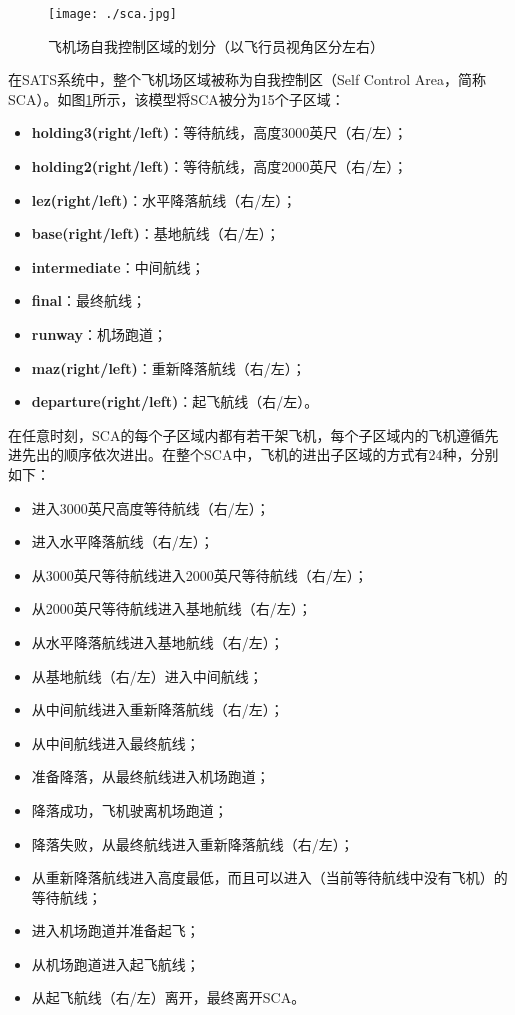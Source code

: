 \begin{figure}
	\centering
	\texttt{[image: ./sca.jpg]}
	\caption{飞机场自我控制区域的划分（以飞行员视角区分左右）}
	\label{fig:example:sats:sca}
\end{figure}

在SATS系统中，整个飞机场区域被称为自我控制区（Self Control Area，简称SCA）。如图\ref{fig:example:sats:sca}所示，该模型将SCA被分为15个子区域：
\begin{itemize}
	\item \textbf{holding3(right/left)}：等待航线，高度3000英尺（右/左）；
	\item \textbf{holding2(right/left)}：等待航线，高度2000英尺（右/左）；
	\item \textbf{lez(right/left)}：水平降落航线（右/左）；
	\item \textbf{base(right/left)}：基地航线（右/左）；
	\item \textbf{intermediate}：中间航线；
	\item \textbf{final}：最终航线；
	\item \textbf{runway}：机场跑道；
	\item \textbf{maz(right/left)}：重新降落航线（右/左）；
	\item \textbf{departure(right/left)}：起飞航线（右/左）。
\end{itemize}
在任意时刻，SCA的每个子区域内都有若干架飞机，每个子区域内的飞机遵循先进先出的顺序依次进出。在整个SCA中，飞机的进出子区域的方式有24种，分别如下：
\begin{itemize}
	\item 进入3000英尺高度等待航线（右/左）；
	\item 进入水平降落航线（右/左）；
	\item 从3000英尺等待航线进入2000英尺等待航线（右/左）；
	\item 从2000英尺等待航线进入基地航线（右/左）；
	\item 从水平降落航线进入基地航线（右/左）；
	\item 从基地航线（右/左）进入中间航线；
	\item 从中间航线进入重新降落航线（右/左）；
	\item 从中间航线进入最终航线；
	\item 准备降落，从最终航线进入机场跑道；
	\item 降落成功，飞机驶离机场跑道；
	\item 降落失败，从最终航线进入重新降落航线（右/左）；
	\item 从重新降落航线进入高度最低，而且可以进入（当前等待航线中没有飞机）的等待航线；
	\item 进入机场跑道并准备起飞；
	\item 从机场跑道进入起飞航线；
	\item 从起飞航线（右/左）离开，最终离开SCA。
\end{itemize}
